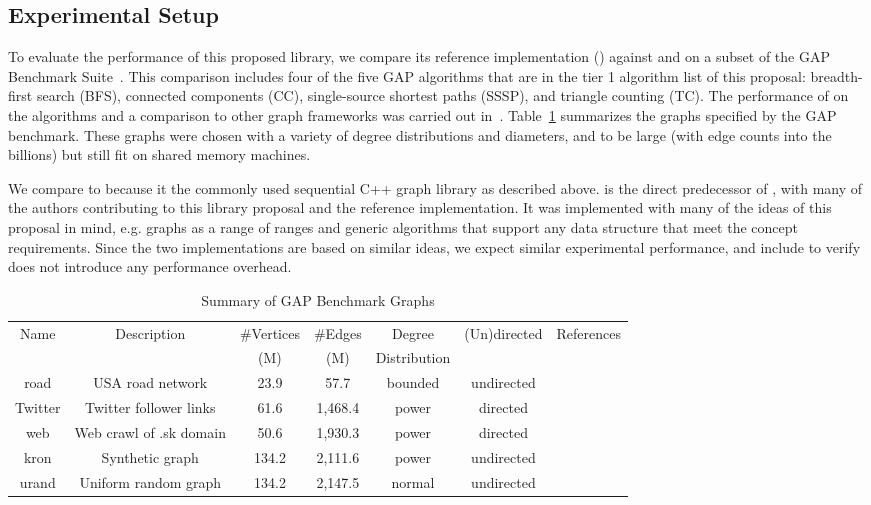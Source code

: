 \subsection{Experimental Setup}
To evaluate the performance of this proposed library, we compare its reference implementation
(\stdgraph) against \bgl and \nwgraph on a subset of the GAP Benchmark Suite~\cite{beamer2015gap}.
This comparison includes four of the five GAP algorithms that are in the tier 1 algorithm list of this proposal:
breadth-first search (BFS), connected components (CC), single-source shortest paths (SSSP), 
and triangle counting (TC).  The performance of \nwgraph on the algorithms and a comparison to other
graph frameworks was carried out in~\cite{gapbs_2023}.
Table~\ref{tab:gap_graphs} summarizes the graphs specified by the GAP benchmark.
These graphs were chosen with a variety of degree distributions and diameters, and to be large (with edge counts into the billions) but still fit on shared memory machines.

We compare to \bgl because it the commonly used sequential C++ graph library as described above.
\nwgraph is the direct predecessor of \stdgraph, with many of the \nwgraph authors contributing to this library proposal and the \stdgraph reference implementation.
It was implemented with many of the ideas of this proposal in mind, e.g. graphs as a range of ranges and generic algorithms that support any data structure that meet the concept requirements.
Since the two implementations are based on similar ideas, we expect similar experimental performance, and include \nwgraph to verify \stdgraph does not introduce any performance overhead.

\begin{table}[h!]
\centering
\begin{tabular}{c c c c c c c}
Name & Description & \#Vertices & \#Edges & Degree & (Un)directed & References \\
     &             & (M)        & (M)     & Distribution & & \\\hline
road & USA road network & 23.9 & 57.7 & bounded & undirected & \cite{dimacs9th}\\\hline
Twitter & Twitter follower links & 61.6 & 1,468.4 & power & directed & \cite{Twitter}\\\hline
web & Web crawl of .sk domain & 50.6 & 1,930.3 & power & directed & \cite{LAW1}\\\hline
kron & Synthetic graph & 134.2 & 2,111.6 & power & undirected & \cite{Graph500} \\\hline
urand & Uniform random graph & 134.2 & 2,147.5 & normal & undirected & \cite{Erdos}\\\hline
\end{tabular}
\caption{Summary of GAP Benchmark Graphs}
\label{tab:gap_graphs}
\end{table}

